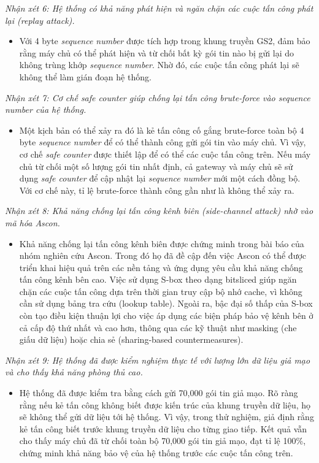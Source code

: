 \textit{Nhận xét 6: Hệ thống có khả năng phát hiện và ngăn chặn các cuộc tấn công phát lại (replay attack).}
\begin{itemize}
    \item Với 4 byte \textit{sequence number} được tích hợp trong khung truyền GS2, đảm bảo rằng máy chủ có thể phát hiện và từ chối bất kỳ gói tin nào bị gửi lại do không trùng khớp \textit{sequence number}. Nhờ đó, các cuộc tấn công phát lại sẽ không thể làm gián đoạn hệ thống.
\end{itemize}

\textit{Nhận xét 7: Cơ chế safe counter giúp chống lại tấn công brute-force vào sequence number của hệ thống.}
\begin{itemize}
    \item Một kịch bản có thể xảy ra đó là kẻ tấn công cố gắng brute-force toàn bộ 4 byte \textit{sequence number} để có thể thành công gửi gói tin vào máy chủ. Vì vậy, cơ chế \textit{safe counter} được thiết lập để có thể các cuộc tấn công trên. Nếu máy chủ từ chối một số lượng gói tin nhất định, cả gateway và máy chủ sẽ sử dụng \textit{safe counter} để cập nhật lại \textit{sequence number} mới một cách đồng bộ. Với cơ chế này, tỉ lệ brute-force thành công gần như là không thể xảy ra. 
\end{itemize}

\textit{Nhận xét 8: Khả năng chống lại tấn công kênh biên (side-channel attack) nhờ vào mã hóa Ascon.}
\begin{itemize}
    \item Khả năng chống lại tấn công kênh biên được chứng minh trong bài báo \cite{asconv1.2} của nhóm nghiên cứu Ascon. Trong đó họ đã đề cập đến việc
    Ascon có thể được triển khai hiệu quả trên các nền tảng và ứng dụng yêu cầu khả năng chống tấn công kênh bên cao. Việc sử dụng S-box theo dạng bitsliced giúp ngăn chặn các cuộc tấn công dựa trên thời gian truy cập bộ nhớ cache, vì không cần sử dụng bảng tra cứu (lookup table). Ngoài ra, bậc đại số thấp của S-box còn tạo điều kiện thuận lợi cho việc áp dụng các biện pháp bảo vệ kênh bên ở cả cấp độ thứ nhất và cao hơn, thông qua các kỹ thuật như masking (che giấu dữ liệu) hoặc chia sẻ (sharing-based countermeasures). 
\end{itemize}

\textit{Nhận xét 9: Hệ thống đã được kiểm nghiệm thực tế với lượng lớn dữ liệu giả mạo và cho thấy khả năng phòng thủ cao.}
\begin{itemize}
    \item Hệ thống đã được kiểm tra bằng cách gửi 70,000 gói tin giả mạo. Rõ ràng rằng nếu kẻ tấn công không biết được kiến trúc của khung truyền dữ liệu, họ sẽ không thể gửi dữ liệu tới hệ thống. Vì vậy, trong thử nghiệm, giả định rằng kẻ tấn công biết trước khung truyền dữ liệu cho từng giao tiếp. Kết quả vẫn cho thấy máy chủ đã từ chối toàn bộ 70,000 gói tin giả mạo, đạt tỉ lệ 100\%, chứng minh khả năng bảo vệ của hệ thống trước các cuộc tấn công trên.
\end{itemize}

